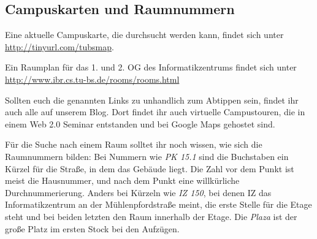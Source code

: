\subsection{Campuskarten und Raumnummern}
\label{campuskarte}
Eine aktuelle Campuskarte, die durchsucht werden kann, findet sich unter \url{http://tinyurl.com/tubsmap}.

Ein Raumplan für das 1. und 2. OG des Informatikzentrums findet sich
unter \url{http://www.ibr.cs.tu-bs.de/rooms/rooms.html}

Sollten euch die genannten Links zu unhandlich zum Abtippen sein, findet ihr
auch alle auf unserem Blog. Dort findet ihr auch virtuelle Campustouren, die  in einem Web 2.0 Seminar entstanden und
bei Google Maps gehostet sind.

Für die Suche nach einem Raum solltet ihr noch wissen, wie sich die Raumnummern bilden: Bei Nummern wie \textit{PK 15.1} sind die Buchstaben ein Kürzel für die Straße, in dem das Gebäude liegt. Die Zahl vor dem Punkt ist meist die Hausnummer, und nach dem Punkt eine willkürliche Durchnummerierung. Anders bei Kürzeln wie \textit{IZ 150}, bei denen IZ das Informatikzentrum an der Mühlenpfordstraße meint, die erste Stelle für die Etage steht und bei beiden letzten den Raum innerhalb der Etage. Die \textit{Plaza} ist der große Platz im ersten Stock bei den Aufzügen.